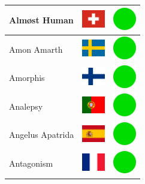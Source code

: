 \documentclass[12pt, a4paper, twoside]{report}
\begin{document}
\begin{center}
\begin{longtable}{|p{5cm}|p{2cm}|p{2cm}|}
Almøst Human & \includegraphics[width=1cm]{4x3/ch} & \includegraphics[width=1cm]{likes/y} \\ \hline
Amon Amarth & \includegraphics[width=1cm]{4x3/se} & \includegraphics[width=1cm]{likes/y} \\ \hline
Amorphis & \includegraphics[width=1cm]{4x3/fi} & \includegraphics[width=1cm]{likes/y} \\ \hline
Analepsy & \includegraphics[width=1cm]{4x3/pt} & \includegraphics[width=1cm]{likes/y} \\ \hline
Angelus Apatrida & \includegraphics[width=1cm]{4x3/es} & \includegraphics[width=1cm]{likes/y} \\ \hline
Antagonism & \includegraphics[width=1cm]{4x3/fr} & \includegraphics[width=1cm]{likes/y} \\ \hline

\end{longtable}
\end{center}
\end{document}
